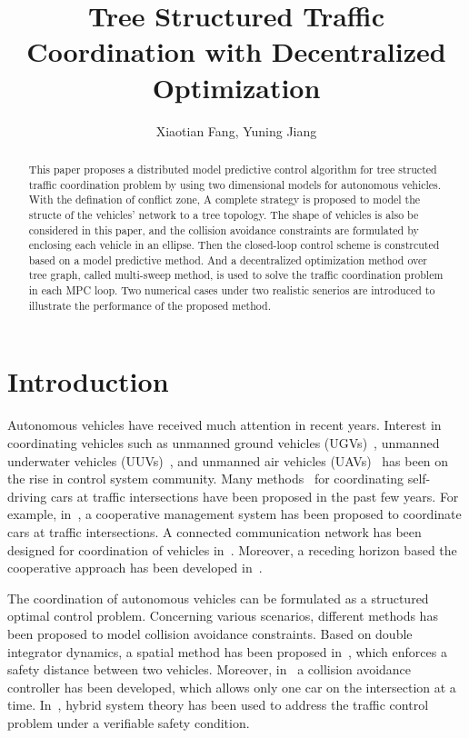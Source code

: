 \documentclass[letterpaper, 10 pt, conference]{ieeeconf}
\title{\bf Tree Structured Traffic Coordination with Decentralized Optimization}
\author{Xiaotian Fang, Yuning Jiang}
\begin{document}
\maketitle
\thispagestyle{empty}
\pagestyle{empty}

\begin{abstract}
	This paper proposes a distributed model predictive control algorithm for tree structed traffic coordination problem by using two dimensional models for autonomous vehicles. With the defination of conflict zone, A complete strategy is proposed to model the structe of the vehicles' network to a tree topology. The shape of vehicles is also be considered in this paper, and the collision avoidance constraints are formulated by enclosing each vehicle in an ellipse. Then the closed-loop control scheme is constrcuted based on a model predictive method. And a decentralized optimization method over tree graph, called multi-sweep method, is used to solve the traffic coordination problem in each MPC loop. Two numerical cases under two realistic senerios are introduced to illustrate the performance of the proposed method.
\end{abstract}


\section{Introduction}
Autonomous vehicles have received much attention in recent years. Interest in coordinating vehicles such as unmanned ground vehicles (UGVs)~\cite{Hult2015}, unmanned underwater vehicles (UUVs)~\cite{Yan2018}, and unmanned air vehicles (UAVs)~\cite{Keviczky2008} has been on the rise in control system community. Many methods~\cite{Kowshik2011,Lee2012,Campos2013,Chen2016} for coordinating self-driving cars at traffic intersections have been proposed in the past few years. For example, in~\cite{Chen2016}, a cooperative management system has been proposed to coordinate cars at traffic intersections. A connected communication network has been designed for coordination of vehicles in~\cite{Lee2012}. Moreover, a receding horizon based the cooperative approach has been developed in~\cite{Campos2014}.

The coordination of autonomous vehicles can be formulated as a structured optimal control problem. Concerning various scenarios, different methods has been proposed to model collision avoidance constraints. Based on double integrator dynamics, a spatial method has been proposed in~\cite{Katriniok2017}, which enforces a safety distance between two vehicles. Moreover, in~\cite{Hult2015} a collision avoidance controller has been developed, which allows only one car on the intersection at a time. In~\cite{Hafner2013}, hybrid system theory has been used to address the traffic control problem under a verifiable safety condition.
\end{document}
